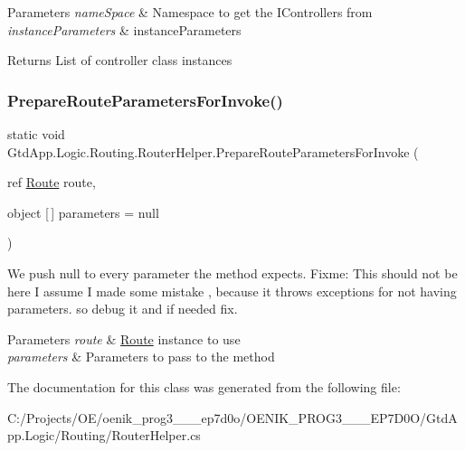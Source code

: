 \begin{DoxyParams}{Parameters}
{\em name\+Space} & Namespace to get the I\+Controllers from\\
\hline
{\em instance\+Parameters} & instance\+Parameters\\
\hline
\end{DoxyParams}
\begin{DoxyReturn}{Returns}
List of controller class instances
\end{DoxyReturn}
\mbox{\label{class_gtd_app_1_1_logic_1_1_routing_1_1_router_helper_a30034fc82c4843ddba655438c2f6b031}} 
\subsubsection{\texorpdfstring{Prepare\+Route\+Parameters\+For\+Invoke()}{PrepareRouteParametersForInvoke()}}
{\footnotesize\ttfamily static void Gtd\+App.\+Logic.\+Routing.\+Router\+Helper.\+Prepare\+Route\+Parameters\+For\+Invoke (\begin{DoxyParamCaption}\item[{ref \mbox{\hyperlink{class_gtd_app_1_1_logic_1_1_routing_1_1_route}{Route}}}]{route,  }\item[{object \mbox{[}$\,$\mbox{]}}]{parameters = {\ttfamily null} }\end{DoxyParamCaption})\hspace{0.3cm}{\ttfamily [static]}}



We push null to every parameter the method expects. Fixme\+: This should not be here I assume I made some mistake , because it throws exceptions for not having parameters. so debug it and if needed fix. 


\begin{DoxyParams}{Parameters}
{\em route} & \mbox{\hyperlink{class_gtd_app_1_1_logic_1_1_routing_1_1_route}{Route}} instance to use\\
\hline
{\em parameters} & Parameters to pass to the method\\
\hline
\end{DoxyParams}


The documentation for this class was generated from the following file\+:\begin{DoxyCompactItemize}
\item 
C\+:/\+Projects/\+O\+E/oenik\+\_\+prog3\+\_\+\_\+\_\+ep7d0o/\+O\+E\+N\+I\+K\+\_\+\+P\+R\+O\+G3\+\_\+\_\+\_\+\+E\+P7\+D0\+O/\+Gtd\+App.\+Logic/\+Routing/Router\+Helper.\+cs\end{DoxyCompactItemize}
